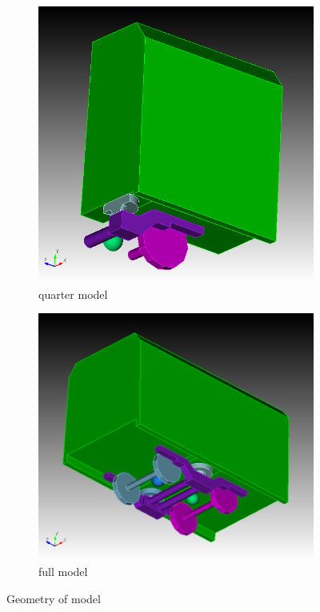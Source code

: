 \begin{figure}[H]
	\centering
	\begin{subfigure}[b]{0.4\textwidth}
		\centering
		\includegraphics[width=0.9\linewidth]{fig/chap4/geometry/one_fourth_model.png}
		\caption{quarter model}
		\label{fig:fourth_model}
	\end{subfigure}
	\hfill
	\begin{subfigure}[b]{0.4\textwidth}
		\centering
		\includegraphics[width=\linewidth]{fig/chap4/geometry/initial_model_2.png}
		\caption{full model}
		\label{fig:full_model}
	\end{subfigure}
	\caption{Geometry of model}
\end{figure}

